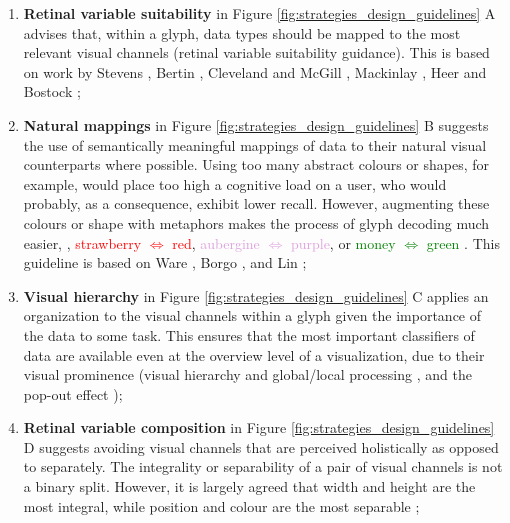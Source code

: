 \begin{enumerate}

\item \textbf{Retinal variable suitability} in Figure \ref{fig:strategies_design_guidelines} A advises that, within a glyph, data types  should be mapped to the most relevant visual channels (retinal variable suitability guidance). This is based on work by Stevens \cite{stevens1975}, Bertin \cite{Bertin:1983:book}, Cleveland and McGill \cite{cleveland1984graphical}, Mackinlay \cite{mackinlay1986automating}, Heer and Bostock \cite{heer2010crowdsourcing};

\item \textbf{Natural mappings} in Figure \ref{fig:strategies_design_guidelines} B suggests the use of semantically meaningful mappings of data to their natural visual counterparts where possible.
Using too many abstract colours or shapes, for example, would place too high a cognitive load on a user, who would probably, as a consequence, exhibit lower recall.
However, augmenting these colours or shape with metaphors makes the process of glyph decoding much easier, \eg, \textcolor{Red}{strawberry $\Leftrightarrow$ red}, \textcolor{Plum}{aubergine $\Leftrightarrow$ purple}, or \textcolor{Green}{money $\Leftrightarrow$ green} \cite{lin2013selecting}.
This guideline is based on Ware \cite{ware2010visual, ware13}, Borgo \etal \cite{Borgo12}, and Lin \etal \cite{lin2013selecting};

\item \textbf{Visual hierarchy} in Figure \ref{fig:strategies_design_guidelines} C applies an organization to the visual channels within a glyph given the importance of the data to some task.
This ensures that the most important classifiers of data are available even at the overview level of a visualization, due to their visual prominence (visual hierarchy and global/local processing \cite{palmer77, navon77, shor71, love99, kinchla79}, and the pop-out effect \cite{treisman88, Hsiao200293, williams67,quinlan87,ropinski11, kandel2012principles});

\item \textbf{Retinal variable composition} in Figure \ref{fig:strategies_design_guidelines} D suggests avoiding visual channels that are perceived holistically as opposed to separately\cite{attneave1950dimensions, shepard64, garner1970integrality, garner1974processing}. The integrality or separability of a pair of visual channels is not a binary split. However, it is largely agreed that width and height are the most integral, while position and colour are the most separable \cite{ware13}; 


\end{enumerate}
